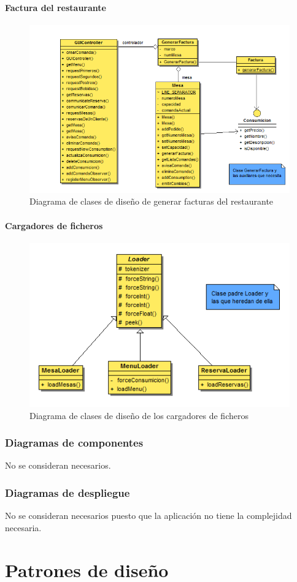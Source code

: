 \documentclass[spanish,a4paper,11pt, twoside]{report}	%
\begin{document}
		\subsection{Factura del restaurante}
		\begin{figure}[!h]
		\centering
		\includegraphics[scale=0.5]{DCDfactura.png}
		\caption{Diagrama de clases de diseño de generar facturas del restaurante}
		\end{figure}

		\subsection{Cargadores de ficheros}
		\begin{figure}[!h]
		\centering
		\includegraphics[scale=0.5]{DCDloader.png}
		\caption{Diagrama de clases de diseño de los cargadores de ficheros}
		\end{figure}

	\section{Diagramas de componentes}
	No se consideran necesarios.

	\section{Diagramas de despliegue}
	No se consideran necesarios puesto que la aplicación no tiene la complejidad necesaria.





\setcounter{section}{0}
\part{Patrones de diseño}



\newpage
\mbox{}
\thispagestyle{empty}						%
\newpage
\end{document}

